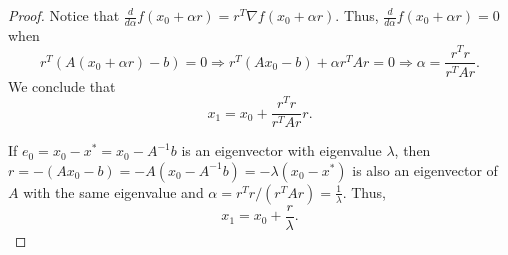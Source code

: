 \documentclass[10pt]{article}
\begin{document}
\begin{itemize}
\begin{proof}
Notice that $ \frac{d}{d \alpha} f(x_0 + \alpha r) = r^T \nabla f(x_0 + \alpha r) $. Thus, $ \frac{d}{d \alpha} f(x_0 + \alpha r) = 0 $ when $$
r^T ( A(x_0 + \alpha r) - b ) = 0 \Rightarrow r^T(Ax_0 - b) + \alpha r^T A r = 0 \Rightarrow \alpha = \frac{r^T r}{r^T A r}.
$$ We conclude that $$
x_1 = x_0 + \frac{r^T r}{r^T A r} r.
$$

If $ e_0 = x_0 - x^* = x_0 - A^{-1} b $ is an eigenvector with eigenvalue $ \lambda $, then $ r = - ( Ax_0 - b ) = -A(x_0 - A^{-1}b) = - \lambda(x_0 - x^*) $ is also an eigenvector of $A$ with the same eigenvalue and $ \alpha = r^T r/(r^T A r) = \frac{1}{\lambda} $. Thus, $$
x_1 = x_0 + \frac{r}{\lambda}.
$$ \end{proof}

\end{itemize}

\end{document}
